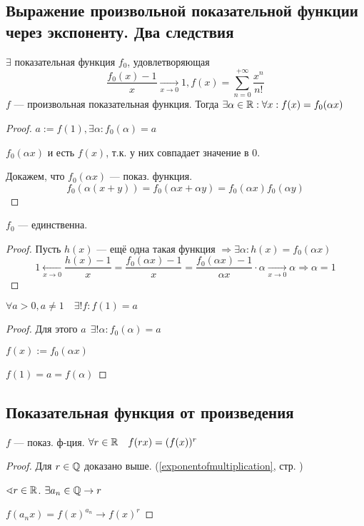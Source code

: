 \subsection{Выражение произвольной показательной функции через экспоненту. Два следствия}
$\exists$ показательная функция $f_0$, удовлетворяющая
$$\frac{f_0(x)-1}{x}\xrightarrow[x\to0]{}1, f(x)=\sum\limits_{n=0}^{+\infty}\frac{x^n}{n!}$$
$f$ --- произвольная показательная функция. Тогда $\exists \alpha\in\mathbb{R} : \forall x : f(x)=f_0(\alpha x)$
\begin{proof}
    $a:=f(1), \exists \alpha : f_0(\alpha)=a$

    $f_0(\alpha x)$ и есть $f(x)$, т.к. у них совпадает значение в 0.
    
    Докажем, что $f_0(\alpha x)$ --- показ. функция.
    $$f_0(\alpha(x+y))=f_0(\alpha x + \alpha y)=f_0(\alpha x)f_0(\alpha y)$$
\end{proof}
\begin{consequence}
    $f_0$ --- единственна.
\end{consequence}
\begin{proof}
    Пусть $h(x)$ --- ещё одна такая функция $\Rightarrow \exists \alpha : h(x)=f_0(\alpha x)$
    $$1\xleftarrow[x\to0]{} \frac{h(x)-1}{x}=\frac{f_0(\alpha x)-1}{x}=\frac{f_0(\alpha x)-1}{\alpha x}\cdot \alpha\xrightarrow[x\to0]{} \alpha \Rightarrow \alpha=1$$
\end{proof}
\begin{consequence}
    $\forall a>0, a\not=1 \quad \exists! f : f(1)=a$
\end{consequence}
\begin{proof}
    Для этого $a \ \ \exists! \alpha : f_0(\alpha)=a$

    $f(x):=f_0(\alpha x)$

    $f(1)=a=f(\alpha)$
\end{proof}

\subsection{Показательная функция от произведения}
$f$ --- показ. ф-ция. $\forall r\in\mathbb{R} \quad f(rx)=(f(x))^r$

\begin{proof}
    Для $r\in\mathbb{Q}$ доказано выше. (\ref{exponentofmultiplication}, стр. \pageref{exponentofmultiplication})

    $\sphericalangle r\in\mathbb{R}$. $\exists a_{n}\in\mathbb{Q} \to r$
    
    $f(a_nx)=f(x)^{a_n}\to f(x)^r$
\end{proof}

